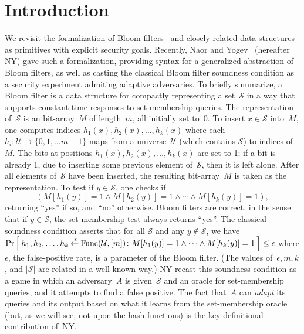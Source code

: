 
\section{Introduction}
We revisit the formalization of Bloom filters~\cite{xxx} and closely
related data structures as primitives with explicit security goals.
Recently, Naor and Yogev~\cite{xxx} (hereafter NY) gave such a
formalization, providing syntax for a generalized abstraction of
Bloom filters, as well as casting the classical Bloom filter
soundness condition as a security experiment admiting adaptive
adversaries.  To briefly summarize, a Bloom filter is a data
structure for compactly representing a set~$\mathcal{S}$ in a way
that supports constant-time responses to set-membership queries. The
representation of~$\mathcal{S}$ is an bit-array~$M$ of length~$m$,
all initially set to~0.  To insert $x \in \mathcal{S}$ into~$M$, one
computes indices $h_1(x),h_2(x),\ldots,h_k(x)$ where each $h_i
\colon \mathcal{U} \to \{0,1,\ldots m-1\}$ maps from a
universe~$\mathcal{U}$ (which contains $\mathcal{S}$) to indices
of~$M$.  The bits at positions $h_1(x),h_2(x),\ldots,h_k(x)$ are set
to 1; if a bit is already 1, due to inserting some previous element
of~$\mathcal{S}$, then it is left alone.  After all elements
of~$\mathcal{S}$ have been inserted, the resulting bit-array~$M$ is
taken as the representation.  To test if $y \in \mathcal{S}$, one
checks if \[(M[h_1(y)]=1 \wedge M[h_2(y)]=1 \wedge \cdots \wedge
M[h_k(y)]=1),\] returning ``yes'' if so, and ``no'' otherwise. Bloom
filters are correct, in the sense that if $y \in \mathcal{S}$, the
set-membership test always returns ``yes''.  The classical soundness
condition asserts that for all $\mathcal{S}$ and any $y
\notin\mathcal{S}$, we have $\Pr\left[\: h_1,h_2,\ldots,h_k {\:\stackrel{{\scriptscriptstyle \hspace{0.2em}\$}} {\leftarrow}\:}
\mathrm{Func}(\mathcal{U},[m])\colon M[h_1(y)]=1 \wedge \cdots
\wedge M[h_k(y)]=1 \:\right] \leq \epsilon$ where $\epsilon$, the
false-positive rate, is a parameter of the Bloom filter.  (The
values of~$\epsilon,m,k$, and $|\mathcal{S}|$ are related in a
well-known way.) NY recast this soundness condition as a game in
which an adversary~$A$ is given~$\mathcal{S}$ and an oracle for
set-membership queries, and it attempts to find a false positive.
The fact that~$A$ can \emph{adapt} its queries and its output based
on what it learns from the set-membership oracle (but, as we will see,
not upon the hash functions) is the key definitional contribution of~NY.

